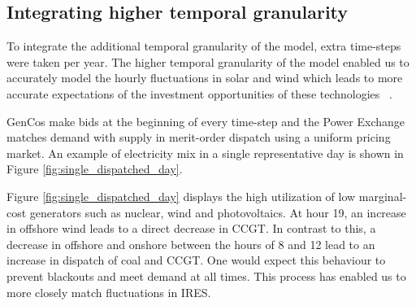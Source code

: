 %
%
%
%


\subsection{Integrating higher temporal granularity}

To integrate the additional temporal granularity of the model, extra time-steps were taken per year. The higher temporal granularity of the model enabled us to accurately model the hourly fluctuations in solar and wind  which leads to more accurate expectations of the investment opportunities of these technologies ~\cite{Ludig2011,Haydt2011}.

GenCos make bids at the beginning of every time-step and the Power Exchange matches demand with supply in merit-order dispatch using a uniform pricing market. An example of electricity mix in a single representative day is shown in Figure \ref{fig:single_dispatched_day}. 

%

Figure \ref{fig:single_dispatched_day} displays the high utilization of low marginal-cost generators such as nuclear, wind and photovoltaics. At hour 19, an increase in offshore wind leads to a direct decrease in CCGT. In contrast to this, a decrease in offshore and onshore between the hours of 8 and 12 lead to an increase in dispatch of coal and CCGT. One would expect this behaviour to prevent blackouts and meet demand at all times. This process has enabled us to more closely match fluctuations in IRES.


